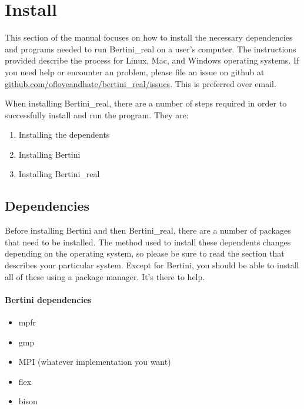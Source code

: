 
\section{Install}


\label{sec:installation}
	This section of the manual focuses on how to install the necessary dependencies and programs needed to run Bertini\_real on a user's computer. The instructions provided describe the process for Linux, Mac, and Windows operating systems.  If you need help or encounter an problem, please file an issue on github at \href{https://github.com/ofloveandhate/bertini_real/issues}{github.com/ofloveandhate/bertini\_real/issues}.  This is preferred over email.

	When installing Bertini\_real, there are a number of steps required in order to successfully install and run the program. They are:
\begin{enumerate}
\item Installing the \glspl{dependent}
\item Installing Bertini
\item Installing Bertini\_real
\end{enumerate}




\subsection{Dependencies}
\label{sec:deps}

Before installing Bertini and then Bertini\_real, there are a number of packages that need to be installed. The method used to install these \glspl{dependent} changes depending on the operating system, so please be sure to read the section that describes your particular system.  Except for Bertini, you should be able to install all of these using a package manager.  It's there to help.

\paragraph{Bertini dependencies}

\begin{itemize}
\item \gls{mpfr}
\item \gls{gmp}
\item MPI (whatever implementation you want)
\item flex
\item bison
\end{itemize}


